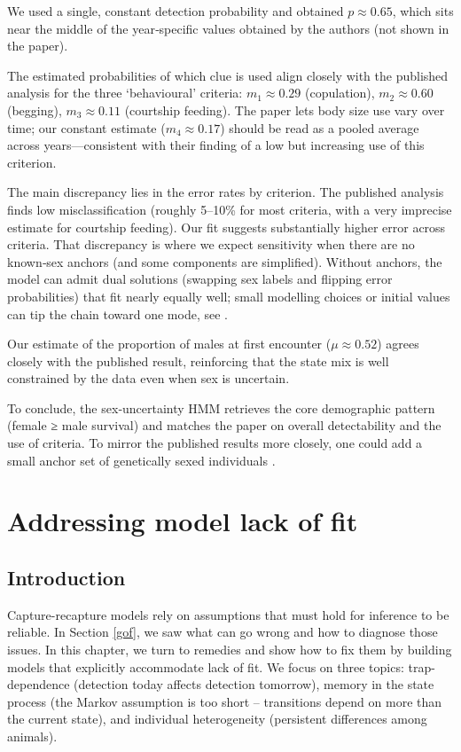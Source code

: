 \documentclass[
  12pt,
]{krantz}
\begin{document}
We used a single, constant detection probability and obtained \(p \approx 0.65\), which sits near the middle of the year‐specific values obtained by the authors (not shown in the paper).

The estimated probabilities of which clue is used align closely with the published analysis for the three `behavioural' criteria: \(m_1 \approx 0.29\) (copulation), \(m_2 \approx 0.60\) (begging), \(m_3 \approx 0.11\) (courtship feeding). The paper lets body size use vary over time; our constant estimate (\(m_4 \approx 0.17\)) should be read as a pooled average across years---consistent with their finding of a low but increasing use of this criterion.

The main discrepancy lies in the error rates by criterion. The published analysis finds low misclassification (roughly 5--10\% for most criteria, with a very imprecise estimate for courtship feeding). Our fit suggests substantially higher error across criteria. That discrepancy is where we expect sensitivity when there are no known‐sex anchors (and some components are simplified). Without anchors, the model can admit dual solutions (swapping sex labels and flipping error probabilities) that fit nearly equally well; small modelling choices or initial values can tip the chain toward one mode, see \citet{pradel2008sex}.

Our estimate of the proportion of males at first encounter (\(\mu \approx 0.52\)) agrees closely with the published result, reinforcing that the state mix is well constrained by the data even when sex is uncertain.

To conclude, the sex‐uncertainty HMM retrieves the core demographic pattern (female ≥ male survival) and matches the paper on overall detectability and the use of criteria. To mirror the published results more closely, one could add a small anchor set of genetically sexed individuals \citep[an information used in][ but that I did not have]{pradel2008sex}.

\chapter{Addressing model lack of fit}\label{lackoffit}

\section{Introduction}\label{introduction-9}

Capture-recapture models rely on assumptions that must hold for inference to be reliable. In Section \ref{gof}, we saw what can go wrong and how to diagnose those issues. In this chapter, we turn to remedies and show how to fix them by building models that explicitly accommodate lack of fit. We focus on three topics: trap-dependence (detection today affects detection tomorrow), memory in the state process (the Markov assumption is too short -- transitions depend on more than the current state), and individual heterogeneity (persistent differences among animals).
\end{document}

